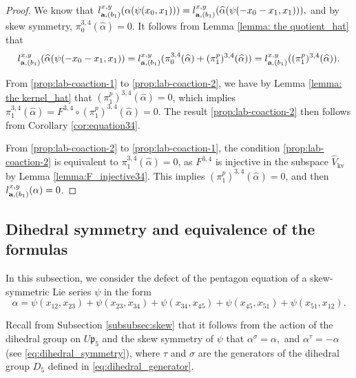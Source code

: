 \documentclass[a4paper,fleqn]{cas-sc}
\DeclareMathOperator{\kv}{kv}
\begin{document}
\begin{proof}
We know that 
$
l^{x,y}_{{\bf{a}},(b_1)}(\alpha(\psi(x_0,x_1)))=l^{x,y}_{{\bf{a}}, (b_1)}(\widehat{\alpha}(\psi(-x_0-x_1,x_1))),
$
and by skew symmetry, $\pi^{3,4}_0(\widehat{\alpha})=0$. It follows from Lemma \ref{lemma: the quotient_hat} that
\begin{align*}
l^{x,y}_{{\bf{a}}, (b_1)}(\widehat{\alpha}(\psi(-x_0-x_1,x_1))
=l^{x,y}_{{\bf{a}},(b_1)}(\pi^{3,4}_0(\widehat{\alpha})+(\pi^p_1)^{3,4}(\widehat{\alpha}))
=l^{x,y}_{{\bf{a}},(b_1)}((\pi^p_1)^{3,4}(\widehat{\alpha})).
\end{align*}

From \eqref{prop:lab-coaction-1} to \eqref{prop:lab-coaction-2}, we have by Lemma \ref{lemma: the kernel_hat} that $(\pi^p_1)^{3,4}(\widehat{\alpha})=0$, which implies $\pi^{3,4}_1(\widehat{\alpha})=F^{3,4}\circ (\pi^p_1)^{3,4}(\widehat{\alpha})=0$. The result \eqref{prop:lab-coaction-2} then follows from Corollary \ref{cor:equation34}.

From \eqref{prop:lab-coaction-2} to \eqref{prop:lab-coaction-1}, the condition \eqref{prop:lab-coaction-2} is equivalent to $\pi^{3,4}_1(\widehat{\alpha})=0$, as $F^{3,4}$ is injective in the subspace $\widehat{V}_{\kv}$ by Lemma \ref{lemma:F_injective34}. This implies $(\pi^p_1)^{3,4}(\widehat{\alpha})=0$, and then $l^{x,y}_{{\bf{a}},(b_1)}(\alpha)=0$.
\end{proof}


\subsection{Dihedral symmetry and equivalence of the formulas} \label{subsection:3_3}

In this subsection, we consider the defect of the pentagon equation of a skew-symmetric Lie series $\psi$ in the form %
\begin{equation*}
\alpha=\psi(x_{12},x_{23})+\psi(x_{23},x_{34})+\psi(x_{34},x_{45})+\psi(x_{45},x_{51})+\psi(x_{51},x_{12}).
\end{equation*} 
 

Recall from Subsection \ref{subsubsec:skew} %
that it follows from the action of the dihedral group on $U\mathfrak{p}_5$ and the skew symmetry of $\psi$ that
$ %
\alpha^{\sigma} = \alpha,$
and $\alpha^{\tau} = -\alpha$ (see \eqref{eq:dihedral_symmetry}),
where $\tau$ and $\sigma$ are the generators of the dihedral group $D_5$ defined in \eqref{eq:dihedral_generator}.
\end{document}
